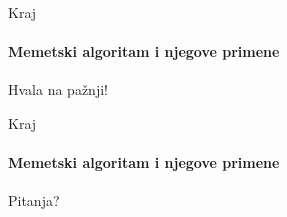 \documentclass{beamer}
\begin{document}
\begin{frame}{Kraj}
  \framesubtitle{Memetski algoritam i njegove primene}

  
\centering
\Huge{Hvala na pažnji!}

\end{frame}




\begin{frame}{Kraj}
  \framesubtitle{Memetski algoritam i njegove primene}
\centering
\Huge{Pitanja?}

\end{frame}
\end{document}
